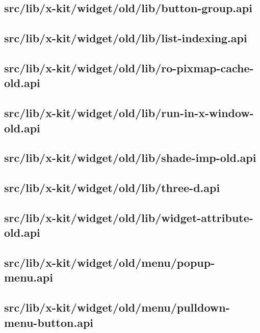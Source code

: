 \subsection{src/lib/x-kit/widget/old/lib/button-group.api}


\subsection{src/lib/x-kit/widget/old/lib/list-indexing.api}


\subsection{src/lib/x-kit/widget/old/lib/ro-pixmap-cache-old.api}


\subsection{src/lib/x-kit/widget/old/lib/run-in-x-window-old.api}


\subsection{src/lib/x-kit/widget/old/lib/shade-imp-old.api}


\subsection{src/lib/x-kit/widget/old/lib/three-d.api}


\subsection{src/lib/x-kit/widget/old/lib/widget-attribute-old.api}


\subsection{src/lib/x-kit/widget/old/menu/popup-menu.api}


\subsection{src/lib/x-kit/widget/old/menu/pulldown-menu-button.api}


